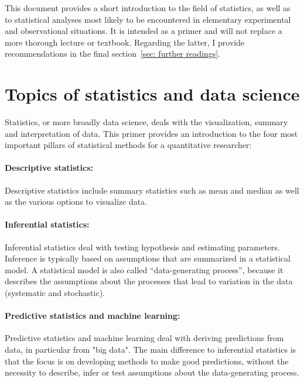 \documentclass[a4paper,twoside]{tufte-book}\usepackage[]{graphicx}\usepackage[]{color}
\begin{document}
This document provides a short introduction to the field of statistics, as well as to statistical analyses most likely to be encountered in elementary experimental and observational situations. It is intended as a primer and will not replace a more thorough lecture or textbook. Regarding the latter, I provide recommendations in the final section~\ref{sec: further readings}.

\section{Topics of statistics and data science}

Statistics, or more broadly data science, deals with the visualization, summary and interpretation of data. This primer provides an introduction to the four most important pillars of statistical methods for a quantitative researcher:

\paragraph{Descriptive statistics:} Descriptive statistics include summary statistics such as mean and median as well as the various options to visualize data.

\paragraph{Inferential statistics:} Inferential statistics deal with testing hypothesis and estimating parameters. Inference is typically based on assumptions that are summarized in a statistical model. A statistical model is also called ``data-generating process'', because it describes the assumptions about the processes that lead to variation in the data (systematic and stochastic).

\paragraph{Predictive statistics and machine learning:} Predictive statistics and machine learning deal with deriving predictions from data, in particular from "big data". The main difference to inferential statistics is that the focus is on developing methods to make good predictions, without the necessity to describe, infer or test assumptions about the data-generating process.
\end{document}
